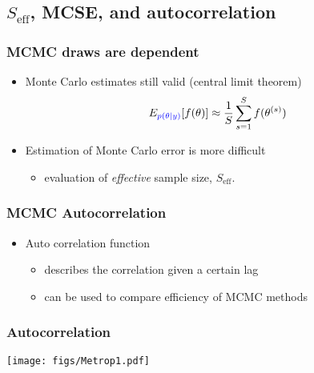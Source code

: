 \documentclass[10pt]{beamer}
\begin{document}
\subsection{$S_\text{eff}$, MCSE, and autocorrelation}


\begin{frame}

\frametitle{MCMC draws are dependent}

  \begin{itemize}
    \item Monte Carlo estimates still valid (central limit theorem)
      \begin{align*}
        E_{\color{blue} p(\theta|y)}[f(\theta)] \approx \frac{1}{S} \sum_{s=1}^S f(\theta^{(s)})
      \end{align*}
    \item Estimation of Monte Carlo error is more difficult
      \begin{itemize}
        \item evaluation of {\it effective} sample size, $S_\text{eff}$.
      \end{itemize}
    \end{itemize}
\end{frame}

\begin{frame}

\frametitle{MCMC Autocorrelation}

  \begin{itemize}
  \item Auto correlation function
    \begin{itemize}
    \item describes the correlation given a certain lag
    \item can be used to compare efficiency of MCMC methods
    \end{itemize}
  \end{itemize}
\end{frame}

\begin{frame}

\frametitle{Autocorrelation}

  \vspace{-0.5\baselineskip}
  \texttt{[image: figs/Metrop1.pdf]}

\end{frame}
\end{document}
